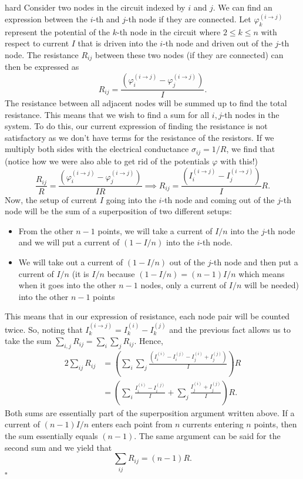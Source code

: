 \begin{solution}{hard}
Consider two nodes in the circuit indexed by $i$ and $j$. We can find an expression between the $i$-th and $j$-th node if they are connected. Let $\varphi_{k}^{(i\to j)}$ represent the potential of the $k$-th node in the circuit where $2\leq k \leq n$ with respect to current $I$ that is driven into the $i$-th node and driven out of the $j$-th node. The resistance $R_{ij}$ between these two nodes (if they are connected) can then be expressed as
\[R_{ij} = \frac{\left(\varphi_{i}^{(i\to j)} - \varphi_{j}^{(i \to j)}\right)}{I}.\]
The resistance between all adjacent nodes will be summed up to find the total resistance. This means that we wish to find a sum for all $i, j$-th nodes in the system. To do this, our current expression of finding the resistance is not satisfactory as we don't have terms for the resistance of the resistors. If we multiply both sides with the electrical conductance $\sigma_{ij} = 1/R$, we find that (notice how we were also able to get rid of the potentials $\varphi$ with this!)
\[
\frac{R_{ij}}{R} = \frac{\left(\varphi_{i}^{(i\to j)} - \varphi_{j}^{(i \to j)}\right)}{IR} \implies R_{ij} = \frac{\left(I_{i}^{(i\to j)} - I_{j}^{(i \to j)}\right)}{I}R.
\]
Now, the setup of current $I$ going into the $i$-th node and coming out of the $j$-th node will be the sum of a superposition of two different setups:
\begin{itemize}
    \item From the other $n - 1$ points, we will take a current of $I/n$ into the $j$-th node and we will put a current of $(1 - I/n)$ into the $i$-th node. 
    \item We will take out a current of $(1 - I/n)$ out of the $j$-th node and then put a current of $I/n$ (it is $I/n$ because $(1 - I/n) = (n - 1)I/n$ which means when it goes into the other $n - 1$ nodes, only a current of $I/n$ will be needed) into the other $n -1$ points
\end{itemize}
This means that in our expression of resistance, each node pair will be counted twice. So, noting that $I_k^{(i \to j)} = I_k^{(i)} - I_k^{(j)}$ and the previous fact allows us to take the sum $\sum_{i, j} R_{ij} = \sum_{i}\sum_{j} R_{ij}$. Hence, 
\begin{align*}
    2\sum_{ij} R_{ij} &= \left(\sum_{i}\sum_{j} \frac{\left(I_{i}^{(i)} - I_{i}^{(j)} - I_{j}^{(i)} + I_{j}^{(j)}\right)}{I}\right)R \\
    &= \left(\sum_{i} \frac{I_{i}^{(i)} - I_{i}^{(j)}}{I} + \sum_{j} \frac{I_{j}^{(i)} + I_{j}^{(j)}}{I}\right)R.
\end{align*}
Both sums are essentially part of the superposition argument written above. If a current of $(n - 1)I/n$ enters each point from $n$ currents entering $n$ points, then the sum essentially equals $(n - 1)$. The same argument can be said for the second sum and we yield that 
\[\sum_{ij} R_{ij} = (n - 1)R.\]
$\square$
\end{solution}